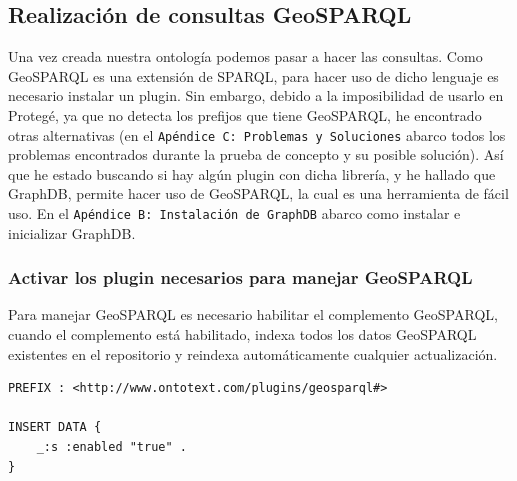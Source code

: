 \subsection{Realización de consultas GeoSPARQL}


Una vez creada nuestra ontología podemos pasar a hacer las consultas. Como GeoSPARQL es una extensión de SPARQL, para hacer uso de dicho lenguaje es necesario instalar un plugin.  Sin embargo, debido a la imposibilidad de usarlo en Protegé, ya que no detecta los prefijos que tiene GeoSPARQL, he encontrado otras alternativas (en el \texttt{Apéndice C: Problemas y Soluciones} abarco todos los problemas encontrados durante la prueba de concepto y su posible solución). Así que he estado buscando si hay algún plugin con dicha librería, y he hallado que GraphDB, permite hacer uso de GeoSPARQL, la cual es una herramienta de fácil uso. En el \texttt{Apéndice B: Instalación de GraphDB} abarco como instalar e inicializar GraphDB.


\subsubsection{Activar los plugin necesarios para manejar GeoSPARQL}

Para manejar GeoSPARQL es necesario habilitar el complemento GeoSPARQL, cuando el complemento está habilitado, indexa todos los datos GeoSPARQL existentes en el repositorio y reindexa automáticamente cualquier actualización.\\

\begin{lstlisting}
PREFIX : <http://www.ontotext.com/plugins/geosparql#>

INSERT DATA {
	_:s :enabled "true" .
}
\end{lstlisting}

%
%
%
%

